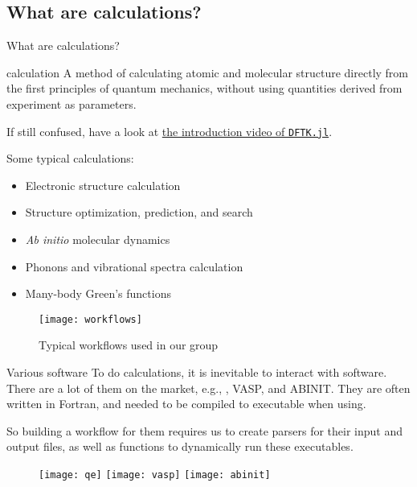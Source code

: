 \subsection{What are \ab{} calculations?}

\begin{frame}[allowframebreaks]{What are \ab{} calculations?}
    \begin{definitionblock}{\ab{} calculation}
        A method of calculating atomic and molecular structure directly from the first
        principles of quantum mechanics, without using quantities derived from experiment
        as parameters.
    \end{definitionblock}

    If still confused, have a look at \href{https://youtu.be/-RomkxjlIcQ}{the introduction video of \texttt{DFTK.jl}}.

    Some typical \ab{} calculations:
    \begin{itemize}
        \item Electronic structure calculation
        \item Structure optimization, prediction, and search
        \item \textit{Ab initio} molecular dynamics
        \item Phonons and vibrational spectra calculation
        \item Many-body Green's functions
    \end{itemize}

    \framebreak

    \begin{figure}[H]
        \centering
        \texttt{[image: workflows]}
        \caption{Typical \ab{} workflows used in our group}
        \label{eq:workflows}
    \end{figure}
\end{frame}

\begin{frame}{Various \ab{} software}
    To do \ab{} calculations, it is inevitable to interact with \ab{} software.
    There are a lot of them on the market, e.g., \qe{}, VASP, and ABINIT.
    They are often written in Fortran, and needed to be compiled to executable
    when using.

    So building a workflow for them requires us to create parsers for their input and output
    files, as well as functions to dynamically run these executables.

    \begin{figure}[b]
        \centering
        \texttt{[image: qe]}
        \hfill
        \texttt{[image: vasp]}
        \hfill
        \texttt{[image: abinit]}
        \label{fig:abinitsoftware}
    \end{figure}
\end{frame}
